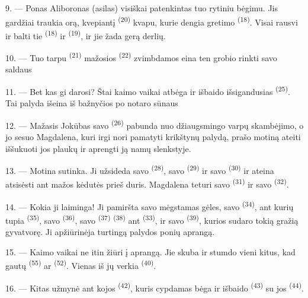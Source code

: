 9. --- Ponas Aliboronas (asilas) visiškai patenkintas tuo rytiniu bėgimu. Jis
gardžiai traukia orą, kvepiantį  \textsuperscript{(20)} kvapu, kurie
dengia gretimo   \textsuperscript{(18)}.
Visai rausvi ir balti tie  \textsuperscript{(18)} ir
 \textsuperscript{(19)}, ir jie žada gerą derlių.

10. --- Tuo tarpu  \textsuperscript{(21)} mažosios 
\textsuperscript{(22)} zvimbdamos eina ten grobio rinkti savo saldaus

11. --- Bet kas gi darosi? Štai kaimo vaikai atbėga ir išbaido išsigandusias
 \textsuperscript{(25)}. Tai palyda išeina iš bažnyčios po notaro sūnaus

12. --- Mažasis Jokūbas savo  \textsuperscript{(26)} pabunda nuo
džiaugsmingo varpų skambėjimo, o jo sesuo Magdalena, kuri irgi nori pamatyti
krikštynų palydą, prašo motiną ateiti iššukuoti jos plaukų ir aprengti ją namų
slenkstyje.

13. --- Motina sutinka. Ji užsideda savo  \textsuperscript{(28)}, savo
 \textsuperscript{(29)} ir savo  \textsuperscript{(30)}
ir ateina atsisėsti ant mažos kėdutės prieš duris. Magdalena teturi savo
 \textsuperscript{(31)} ir savo 
\textsuperscript{(32)}.

14. --- Kokia ji laiminga! Ji pamiršta savo mėgstamas gėles, savo
 \textsuperscript{(34)}, ant kurių tupia 
\textsuperscript{(35)}, savo  \textsuperscript{(36)}, savo
 \textsuperscript{(37)}  \textsuperscript{(38)} ant
 \textsuperscript{(33)}, ir savo  \textsuperscript{(39)},
kurios sudaro tokią gražią gyvatvorę. Ji apžiūrinėja turtingą palydos ponių aprangą.

15. --- Kaimo vaikai ne itin žiūri į aprangą. Jie skuba ir stumdo vieni kitus, kad
gautų  \textsuperscript{(55)} ar 
\textsuperscript{(52)}. Vienas iš jų verkia \textsuperscript{(40)}.

16. --- Kitas užmynė ant kojos  \textsuperscript{(42)}, kuris
cypdamas bėga ir išbaido  \textsuperscript{(43)} su jos
 \textsuperscript{(44)}.

